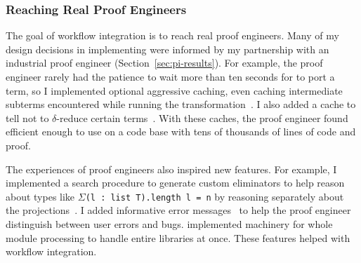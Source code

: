 \subsubsection{Reaching Real Proof Engineers}
\label{sec:engineers}

The goal of workflow integration is to reach real proof engineers.
Many of my design decisions in implementing \toolnamec were informed by my partnership with
an industrial proof engineer (Section~\ref{sec:pi-results}).
For example, the proof engineer rarely had the patience to wait more than ten seconds
for \toolnamec to port a term,
so I implemented optional aggressive caching, even caching intermediate subterms
encountered while running the transformation~\href{https://github.com/uwplse/pumpkin-pi/blob/v2.0.0/plugin/src/cache/caching.ml}{}. %
I also added a cache to tell \toolnamec not to $\delta$-reduce certain terms~\href{https://github.com/uwplse/pumpkin-pi/blob/v2.0.0/plugin/src/cache/caching.ml}{}.
With these caches, the proof engineer found \toolnamec efficient enough to use on a code base with tens of thousands of lines of code and proof.



The experiences of proof engineers also inspired new features.
For example, I implemented a search procedure to generate custom eliminators %
to help reason about types like $\Sigma$\lstinline{(l : list T).length l = n}
by reasoning separately about the projections~\href{https://github.com/uwplse/pumpkin-pi/blob/v2.0.0/plugin/src/automation/search/smartelim.ml}{}. %
I added informative error messages~\href{https://github.com/uwplse/pumpkin-pi/blob/v2.0.0/plugin/src/lib/ornerrors.ml}{} to help the proof engineer distinguish between user errors and bugs. %
 implemented machinery for whole module processing to handle entire libraries at once.
These features helped with workflow integration. %

